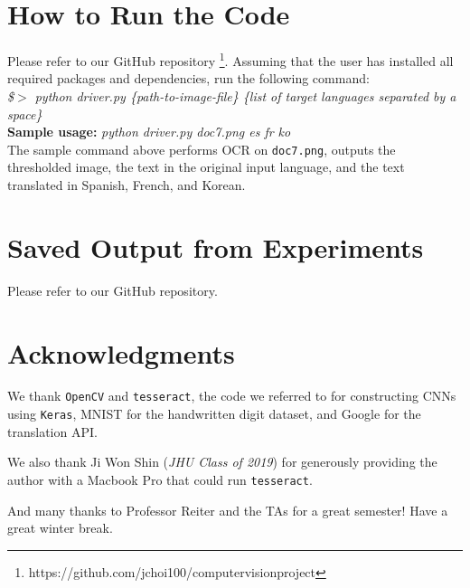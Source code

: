 \documentclass[11pt,letterpaper]{article}
\begin{document}
\section*{How to Run the Code}

Please refer to our GitHub repository \footnote{https://github.com/jchoi100/computer\textunderscore vision\textunderscore project}. Assuming that the user has installed all required packages and dependencies, run the following command:\\

\textit{\$$>$ python driver.py \{path-to-image-file\} \{list of target languages separated by a space\}}\\

\textbf{Sample usage:} \textit{python driver.py doc7.png es fr ko}\\

The sample command above performs OCR on {\tt doc7.png}, outputs the thresholded image, the text in the original input language, and the text translated in Spanish, French, and Korean.

\section*{Saved Output from Experiments}

Please refer to our GitHub repository.

\section*{Acknowledgments}

We thank {\tt OpenCV} and {\tt tesseract}, the code we referred to for constructing CNNs using {\tt Keras},  MNIST for the handwritten digit dataset, and Google for the translation API.

We also thank Ji Won Shin (\textit{JHU Class of 2019}) for generously providing the author with a Macbook Pro that could run {\tt tesseract}.

And many thanks to Professor Reiter and the TAs for a great semester! Have a great winter break.
\end{document}

